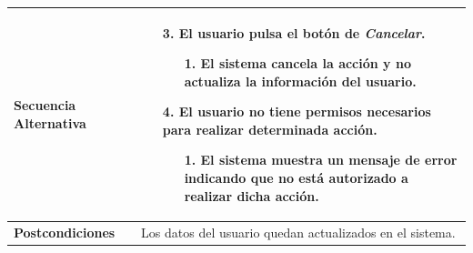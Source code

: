\begin{longtable}{| p{4cm} | p{10cm} |}
\\
\hline
\textbf{Secuencia Alternativa} &\mbox{}\par\vspace{-\baselineskip}
\begin{enumerate}[leftmargin=0.9cm, topsep=0.1cm]
\item[3.] El usuario pulsa el botón de \textit{Cancelar}.
	\begin{itemize}
	\item[1.] El sistema cancela la acción y no actualiza la información del usuario.
	\end{itemize}
\item[4.] El usuario no tiene permisos necesarios para realizar determinada acción.
	\begin{itemize}
	\item[1.] El sistema muestra un mensaje de error indicando que no está autorizado a realizar dicha acción.
	\end{itemize}
\end{enumerate}
\\

\hline
\textbf{Postcondiciones} & 
Los datos del usuario quedan actualizados en el sistema.\\
\hline
\end{longtable}



\newpage
